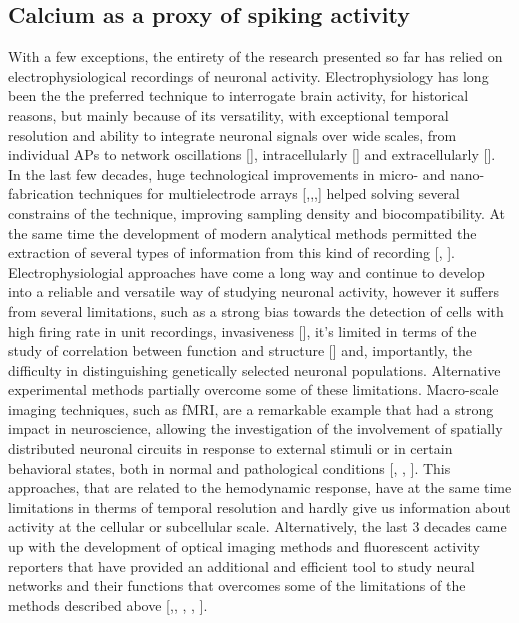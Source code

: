 \subsection{Calcium as a proxy of spiking activity}
\label{chap1:sec:1:subsec3:calcium_proxy_spikes}
With a few exceptions, the entirety of the research presented so far has relied on electrophysiological recordings of neuronal activity.  
Electrophysiology has long been the the preferred technique to interrogate brain activity, for historical reasons, but mainly because of its versatility, with exceptional temporal resolution and ability to integrate neuronal signals over wide scales, from individual APs to network oscillations [\cite{buzsaki2012}], intracellularly [\cite{margrie2003}] and extracellularly [\cite{hubel1959}].
In the last few decades, huge technological improvements in micro- and nano-fabrication techniques for multielectrode arrays [\cite{bareketkeren2012},\cite{spira2013},\cite{viventi2012},\cite{jun2017}] helped solving several constrains of the technique, improving sampling density and biocompatibility.
At the same time the development of modern analytical methods permitted the extraction of several types of information from this kind of recording [\cite{agarwal2014}, \cite{sheinidelson2017}]. 
Electrophysiologial approaches have come a long way and continue to develop into a reliable and versatile way of studying neuronal activity, however it suffers from several limitations, such as a strong bias towards the detection of cells with high firing rate in unit recordings, invasiveness [\cite{kim2013}], it's limited in terms of the study of correlation between function and structure [\cite{dombeck2010}] and, importantly, the difficulty in distinguishing genetically selected neuronal populations.
Alternative experimental methods partially overcome some of these limitations.
Macro-scale imaging techniques, such as fMRI, are a remarkable example that had a strong impact in neuroscience, allowing the investigation of the involvement of spatially distributed neuronal circuits in response to external stimuli or in certain behavioral states, both in normal and pathological conditions [\cite{craddock2013}, \cite{ugurbil2013}, \cite{vanessen2013}]. 
This approaches, that are related to the hemodynamic response, have at the same time limitations in therms of temporal resolution and hardly give us information about activity at the cellular or subcellular scale. 
Alternatively, the last 3 decades came up with the development of optical imaging methods and fluorescent activity reporters that have provided an additional and efficient tool to study neural networks and their functions that overcomes some of the limitations of the methods described above [\cite{ohki2005},\cite{shoham1999}, \cite{grienberger2012}, \cite{bovetti2014}, \cite{yang2017}]. 
